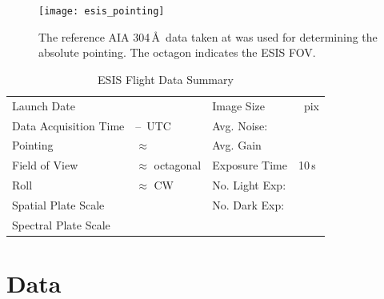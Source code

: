 		
		
		\begin{figure}[ht]
			\begin{center}
				\texttt{[image: esis\_pointing]}
				\caption{The reference AIA 304\,\AA\ data taken at \aianearapogee was used for determining the absolute pointing. The octagon indicates the ESIS FOV.}
				\label{fig:fov}
			\end{center}
		\end{figure}
	

		\begin{table}
		\begin{center}
			\caption{ESIS Flight Data Summary}
			\label{tab:data_info}
			\begin{tabular}{ll|ll}\hline
				Launch Date & \dateMission & Image Size  & \imageShape~pix\\
				Data Acquisition Time & \timeDataStart--\timeDataStop~UTC & Avg. Noise: & \readoutNoise\tablenotemark{a}\\ 
			    Pointing   &  $\approx$ \esispointing & Avg. Gain &   \gain \\
				Field of View  & $\approx$ \esisfov octagonal  & Exposure Time & 10\,s \\
				Roll & $\approx$ \esisroll CW & No. Light Exp: &\numDataFrames\\
			    Spatial  Plate Scale  &  \plateScale & No. Dark Exp: &\numDarkFrames \\
				Spectral  Plate Scale  &  \dispersion & \\
					\hline
			\end{tabular}
		\end{center}
		\end{table}
		
		



	
\section{Data} 

